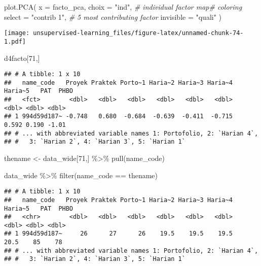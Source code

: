 \documentclass[
]{article}
\newenvironment{Shaded}{\begin{snugshade}}{\end{snugshade}}
\newcommand{\AttributeTok}[1]{\textcolor[rgb]{0.77,0.63,0.00}{#1}}
\newcommand{\CommentTok}[1]{\textcolor[rgb]{0.56,0.35,0.01}{\textit{#1}}}
\newcommand{\DecValTok}[1]{\textcolor[rgb]{0.00,0.00,0.81}{#1}}
\newcommand{\FunctionTok}[1]{\textcolor[rgb]{0.00,0.00,0.00}{#1}}
\newcommand{\NormalTok}[1]{#1}
\newcommand{\OtherTok}[1]{\textcolor[rgb]{0.56,0.35,0.01}{#1}}
\newcommand{\SpecialCharTok}[1]{\textcolor[rgb]{0.00,0.00,0.00}{#1}}
\newcommand{\StringTok}[1]{\textcolor[rgb]{0.31,0.60,0.02}{#1}}
\begin{document}
\begin{Shaded}
\begin{Highlighting}[]
\FunctionTok{plot.PCA}\NormalTok{(}
  \AttributeTok{x =}\NormalTok{ facto\_pca, }
  \AttributeTok{choix =} \StringTok{"ind"}\NormalTok{, }\CommentTok{\# individual factor map\# coloring}
  \AttributeTok{select =} \StringTok{"contrib 1"}\NormalTok{, }\CommentTok{\# 5 most contributing factor}
  \AttributeTok{invisible =} \StringTok{"quali"}
\NormalTok{)}
\end{Highlighting}
\end{Shaded}

\texttt{[image: unsupervised-learning\_files/figure-latex/unnamed-chunk-74-1.pdf]}

\begin{Shaded}
\begin{Highlighting}[]
\NormalTok{d4facto[}\DecValTok{71}\NormalTok{,]}
\end{Highlighting}
\end{Shaded}

\begin{verbatim}
## # A tibble: 1 x 10
##   name_code   Proyek Praktek Porto~1 Haria~2 Haria~3 Haria~4 Haria~5   PAT  PHBO
##   <fct>        <dbl>   <dbl>   <dbl>   <dbl>   <dbl>   <dbl>   <dbl> <dbl> <dbl>
## 1 994d59d187~ -0.748   0.680  -0.684  -0.639  -0.411  -0.715   0.592 0.190 -1.01
## # ... with abbreviated variable names 1: Portofolio, 2: `Harian 4`,
## #   3: `Harian 2`, 4: `Harian 3`, 5: `Harian 1`
\end{verbatim}

\begin{Shaded}
\begin{Highlighting}[]
\NormalTok{thename }\OtherTok{\textless{}{-}}\NormalTok{ data\_wide[}\DecValTok{71}\NormalTok{,] }\SpecialCharTok{\%\textgreater{}\%} \FunctionTok{pull}\NormalTok{(name\_code)}
\end{Highlighting}
\end{Shaded}

\begin{Shaded}
\begin{Highlighting}[]
\NormalTok{data\_wide }\SpecialCharTok{\%\textgreater{}\%} 
  \FunctionTok{filter}\NormalTok{(name\_code }\SpecialCharTok{==}\NormalTok{ thename)}
\end{Highlighting}
\end{Shaded}

\begin{verbatim}
## # A tibble: 1 x 10
##   name_code   Proyek Praktek Porto~1 Haria~2 Haria~3 Haria~4 Haria~5   PAT  PHBO
##   <chr>        <dbl>   <dbl>   <dbl>   <dbl>   <dbl>   <dbl>   <dbl> <dbl> <dbl>
## 1 994d59d187~     26      27      26    19.5    19.5    19.5    20.5    85    78
## # ... with abbreviated variable names 1: Portofolio, 2: `Harian 4`,
## #   3: `Harian 2`, 4: `Harian 3`, 5: `Harian 1`
\end{verbatim}
\end{document}
